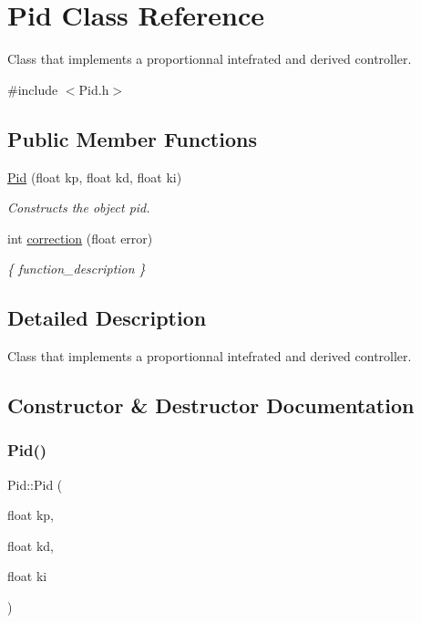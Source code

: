 \hypertarget{class_pid}{}\section{Pid Class Reference}
\label{class_pid}


Class that implements a proportionnal intefrated and derived controller.  




{\ttfamily \#include $<$Pid.\+h$>$}

\subsection*{Public Member Functions}
\begin{DoxyCompactItemize}
\item 
\mbox{\hyperlink{class_pid_abc0ab4f48fd81f9b803df5cd00071730}{Pid}} (float kp, float kd, float ki)
\begin{DoxyCompactList}\small\item\em Constructs the object pid. \end{DoxyCompactList}\item 
int \mbox{\hyperlink{class_pid_ae4fde4dc5b86afc25be2b1894465ad57}{correction}} (float error)
\begin{DoxyCompactList}\small\item\em \{ function\+\_\+description \} \end{DoxyCompactList}\end{DoxyCompactItemize}


\subsection{Detailed Description}
Class that implements a proportionnal intefrated and derived controller. 

\subsection{Constructor \& Destructor Documentation}
\mbox{\label{class_pid_abc0ab4f48fd81f9b803df5cd00071730}} 
\subsubsection{\texorpdfstring{Pid()}{Pid()}}
{\footnotesize\ttfamily Pid\+::\+Pid (\begin{DoxyParamCaption}\item[{float}]{kp,  }\item[{float}]{kd,  }\item[{float}]{ki }\end{DoxyParamCaption})}



